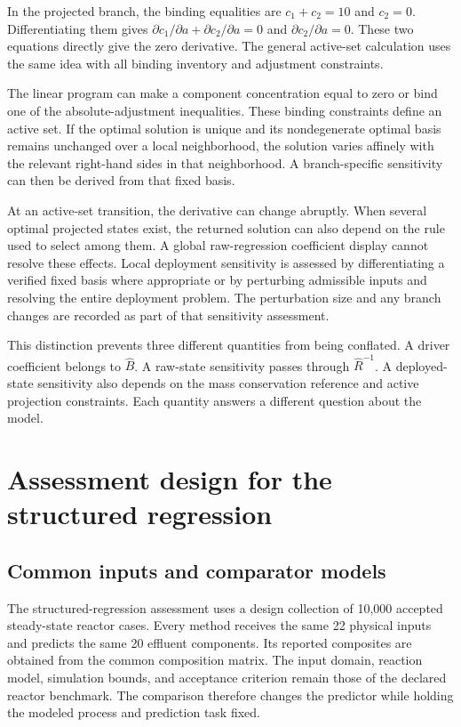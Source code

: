 In the projected branch, the binding equalities are \(c_1+c_2=10\) and \(c_2=0\). Differentiating them gives \(\partial c_1/\partial a+\partial c_2/\partial a=0\) and \(\partial c_2/\partial a=0\). These two equations directly give the zero derivative. The general active-set calculation uses the same idea with all binding inventory and adjustment constraints.

The linear program can make a component concentration equal to zero or bind one of the absolute-adjustment inequalities. These binding constraints define an active set. If the optimal solution is unique and its nondegenerate optimal basis remains unchanged over a local neighborhood, the solution varies affinely with the relevant right-hand sides in that neighborhood. A branch-specific sensitivity can then be derived from that fixed basis.

At an active-set transition, the derivative can change abruptly. When several optimal projected states exist, the returned solution can also depend on the rule used to select among them. A global raw-regression coefficient display cannot resolve these effects. Local deployment sensitivity is assessed by differentiating a verified fixed basis where appropriate or by perturbing admissible inputs and resolving the entire deployment problem. The perturbation size and any branch changes are recorded as part of that sensitivity assessment.

This distinction prevents three different quantities from being conflated. A driver coefficient belongs to \(\widehat B\). A raw-state sensitivity passes through \(\widehat R^{-1}\). A deployed-state sensitivity also depends on the mass conservation reference and active projection constraints. Each quantity answers a different question about the model.

\section{Assessment design for the structured regression}

\subsection{Common inputs and comparator models}

The structured-regression assessment uses a design collection of 10,000 accepted steady-state reactor cases. Every method receives the same 22 physical inputs and predicts the same 20 effluent components. Its reported composites are obtained from the common composition matrix. The input domain, reaction model, simulation bounds, and acceptance criterion remain those of the declared reactor benchmark. The comparison therefore changes the predictor while holding the modeled process and prediction task fixed.

